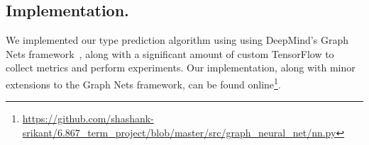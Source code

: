 \subsection{Implementation.}

We implemented our type prediction algorithm using using DeepMind's Graph Nets framework~\cite{deepmind2018graph}, along with a significant amount of custom TensorFlow to collect metrics and perform experiments.
Our implementation, along with minor extensions to the Graph Nets framework, can be found online\footnote{\url{https://github.com/shashank-srikant/6.867_term_project/blob/master/src/graph_neural_net/nn.py}}.